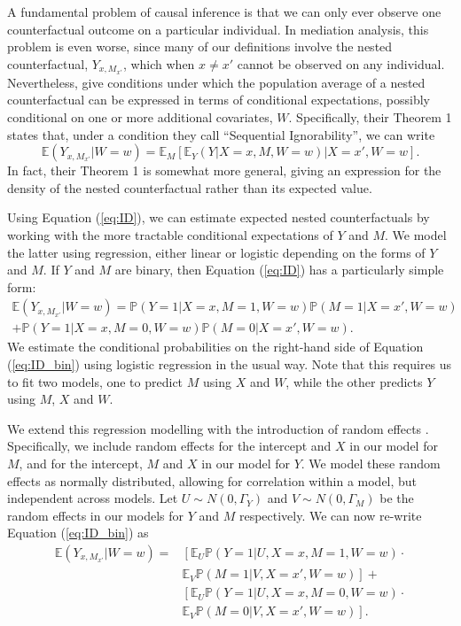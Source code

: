 \documentclass{article}
\newcommand{\bP}{\mathbb{P}}
\newcommand{\bE}{\mathbb{E}}
\begin{document}
A fundamental problem of causal inference is that we can only ever observe one counterfactual outcome on a particular individual. In mediation analysis, this problem is even worse, since many of our definitions involve the nested counterfactual, $Y_{x, M_{x'}}$, which when $x \neq x'$ cannot be observed on any individual. Nevertheless, \citet{Ima10I} give conditions under which the population average of a nested counterfactual can be expressed in terms of conditional expectations, possibly conditional on one or more additional covariates, $W$. Specifically, their Theorem 1 states that, under a condition they call ``Sequential Ignorability'', we can write
%
\begin{equation}
    \bE (Y_{x, M_{x'}} | W=w) = \bE_M \left[ \bE_Y \left( Y | X=x, M, W=w \right) | X=x', W=w \right]. \label{eq:ID}
\end{equation}
%
In fact, their Theorem 1 is somewhat more general, giving an expression for the density of the nested counterfactual rather than its expected value.

Using Equation (\ref{eq:ID}), we can estimate expected nested counterfactuals by working with the more tractable conditional expectations of $Y$ and $M$. We model the latter using regression, either linear or logistic depending on the forms of $Y$ and $M$. If $Y$ and $M$ are binary, then Equation (\ref{eq:ID}) has a particularly simple form:
%
\begin{multline}
    \bE (Y_{x, M_{x'}} | W=w) = \bP \left( Y=1 | X=x, M=1, W=w \right) \bP(M=1 | X = x', W=w) \\ + \bP \left( Y=1 | X=x, M=0, W=w \right) \bP(M=0 | X = x', W=w). \label{eq:ID_bin}
\end{multline}
%
We estimate the conditional probabilities on the right-hand side of Equation (\ref{eq:ID_bin}) using logistic regression in the usual way. Note that this requires us to fit two models, one to predict $M$ using $X$ and $W$, while the other predicts $Y$ using $M$, $X$ and $W$.

We extend this regression modelling with the introduction of random effects \citep[see, e.g.][]{Dem04}. Specifically, we include random effects for the intercept and $X$ in our model for $M$, and for the intercept, $M$ and $X$ in our model for $Y$. We model these random effects as normally distributed, allowing for correlation within a model, but independent across models. Let $U \sim N(0, \Gamma_Y)$ and $V \sim N(0, \Gamma_M)$ be the random effects in our models for $Y$ and $M$ respectively. We can now re-write Equation (\ref{eq:ID_bin}) as
%
\begin{align}
    \bE (Y_{x, M_{x'}} | W=w) = & \left[\bE_U \bP \left( Y=1 |U, X=x, M=1, W=w \right) \right. \cdot \label{eq:ID_bin_ran}\\
    &  \left. \bE_V \bP(M=1 |V, X = x', W=w)\right] + \nonumber \\ 
    & \left[ \bE_U \bP \left( Y=1 |U, X=x, M=0, W=w \right) \right. \cdot \nonumber \\
    & \left. \bE_V \bP(M=0 |V, X = x', W=w) \right]. \nonumber 
\end{align}
%
\end{document}
